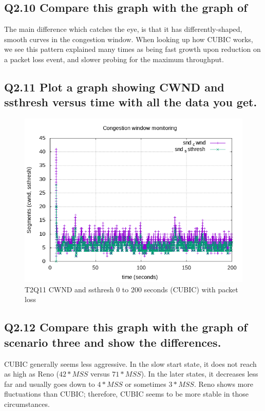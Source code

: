 \documentclass{article}
\begin{document}
\subsection{Q2.10 Compare this graph with the graph of}

The main difference which catches the eye, is that it has differently-shaped,
smooth curves in the congestion window. When looking up how CUBIC works, we see
this pattern explained many times as being fast growth upon reduction on a
packet loss event, and slower probing for the maximum throughput.


\subsection{Q2.11 Plot a graph showing CWND and ssthresh versus time with all the data you get.}

\begin{figure}[H]
	\includegraphics{lab1-group1-task2-question11.png}
	\caption{T2Q11 CWND and ssthresh 0 to 200 seconds (CUBIC) with packet loss}
\end{figure}


\subsection{Q2.12 Compare this graph with the graph of scenario three and show the differences.}

CUBIC generally seems less aggressive. In the slow start state, it does not
reach as high as Reno ($42*MSS$ versus $71*MSS$). In the later states, it
decreases less far and usually goes down to $4*MSS$ or sometimes $3*MSS$. Reno
shows more fluctuations than CUBIC; therefore, CUBIC seems to be more stable in
those circumstances.
\end{document}
